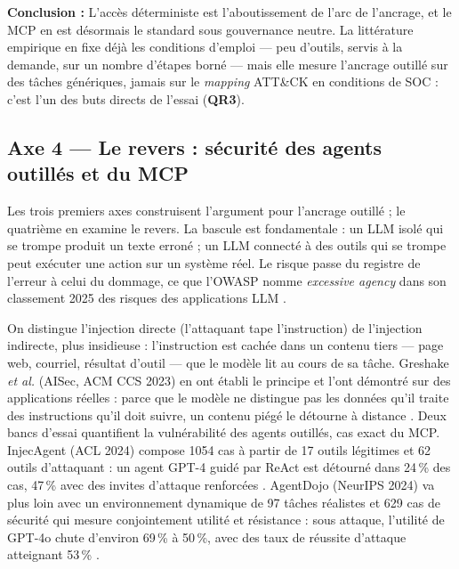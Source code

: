 \begin{encadre}
\textbf{Conclusion :} L'accès déterministe est l'aboutissement de l'arc de l'ancrage, et le MCP en est désormais le standard sous gouvernance neutre. La littérature empirique en fixe déjà les conditions d'emploi --- peu d'outils, servis à la demande, sur un nombre d'étapes borné --- mais elle mesure l'ancrage outillé sur des tâches génériques, jamais sur le \emph{mapping} ATT\&CK en conditions de SOC : c'est l'un des buts directs de l'essai (\textbf{QR3}).
\end{encadre}

\FloatBarrier
\subsection{Axe 4 --- Le revers : sécurité des agents outillés et du MCP}\label{sec:axe4}

Les trois premiers axes construisent l'argument pour l'ancrage outillé ; le quatrième en examine le revers. La bascule est fondamentale : un LLM isolé qui se trompe produit un texte erroné ; un LLM connecté à des outils qui se trompe peut exécuter une action sur un système réel. Le risque passe du registre de l'erreur à celui du dommage, ce que l'OWASP nomme \emph{excessive agency} dans son classement 2025 des risques des applications LLM \cite{owasp}.


On distingue l'injection directe (l'attaquant tape l'instruction) de l'injection indirecte, plus insidieuse : l'instruction est cachée dans un contenu tiers --- page web, courriel, résultat d'outil --- que le modèle lit au cours de sa tâche. Greshake \emph{et al.} (AISec, ACM CCS 2023) en ont établi le principe et l'ont démontré sur des applications réelles : parce que le modèle ne distingue pas les données qu'il traite des instructions qu'il doit suivre, un contenu piégé le détourne à distance \cite{greshake}. Deux bancs d'essai quantifient la vulnérabilité des agents outillés, cas exact du MCP. InjecAgent (ACL 2024) compose 1054 cas à partir de 17 outils légitimes et 62 outils d'attaquant : un agent GPT-4 guidé par ReAct est détourné dans 24\,\% des cas, 47\,\% avec des invites d'attaque renforcées \cite{injecagent}. AgentDojo (NeurIPS 2024) va plus loin avec un environnement dynamique de 97 tâches réalistes et 629 cas de sécurité qui mesure conjointement utilité et résistance : sous attaque, l'utilité de GPT-4o chute d'environ 69\,\% à 50\,\%, avec des taux de réussite d'attaque atteignant 53\,\% \cite{agentdojo}.

